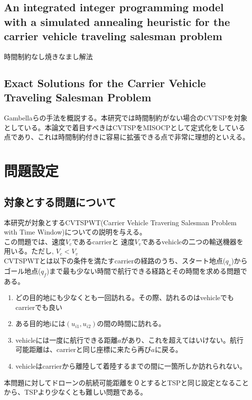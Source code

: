 \documentclass[11pt,a4paper,dvipdfmx,titlepage,uplatex]{jsarticle}
\theoremstyle{mystyle}
\newcommand{\0}{\mathbf{0}}
\begin{document}
\subsection{An integrated integer programming model with a simulated annealing heuristic for the carrier vehicle traveling salesman problem}
時間制約なし焼きなまし解法
\subsection{Exact Solutions for the Carrier Vehicle Traveling Salesman Problem}
Gambellaらの手法を概説する。本研究では時間制約がない場合のCVTSPを対象としている。本論文で着目すべきはCVTSPをMISOCPとして定式化をしている点であり、これは時間制約付きに容易に拡張できる点で非常に理想的といえる。\\
\section{問題設定}\label{sec:Second_Order_Cone_Programming_without_interiorpoint}
\subsection{対象とする問題について}\label{sec:problem_settings}
本研究が対象とするCVTSPWT(Carrier Vehicle Travering Salesman Problem with Time Window)についての説明を与える。\\
この問題では、速度$V_c$であるcarrierと 速度$V_v$であるvehicleの二つの輸送機器を用いる。ただし, $V_c< V_v$\\
CVTSPWTとは以下の条件を満たすcarrierの経路のうち、スタート地点($q_s$)からゴール地点($q_f$)まで最も少ない時間で航行できる経路とその時間を求める問題である。\begin{enumerate}
	\item どの目的地にも少なくとも一回訪れる。その際、訪れるのはvehicleでもcarrierでも良い\\
	\item ある目的地iには$(u_{i1}, u_{i2})$の間の時間に訪れる。\\
	\item  vehicleには一度に航行できる距離$a$があり、これを超えてはいけない。航行可能距離は、carrierと同じ座標に来たら再び$a$に戻る。\\
	\item vehicleはcarrierから離陸して着陸するまでの間に一箇所しか訪れられない。

\end{enumerate}
本問題に対してドローンの航続可能距離を０とするとTSPと同じ設定となることから、TSPより少なくとも難しい問題である。
\end{document}
